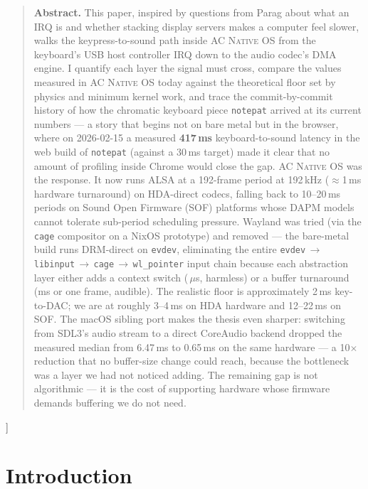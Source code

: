 \documentclass[10pt,letterpaper,twocolumn]{article}
\newcommand{\acos}{\textsc{AC Native OS}}
\begin{document}
{\begin{quote}
\small\noindent\textbf{Abstract.}
This paper, inspired by questions from Parag about what an IRQ is and whether stacking display servers makes a computer feel slower, walks the keypress-to-sound path inside \acos{} from the keyboard's USB host controller IRQ down to the audio codec's DMA engine. I quantify each layer the signal must cross, compare the values measured in \acos{} today against the theoretical floor set by physics and minimum kernel work, and trace the commit-by-commit history of how the chromatic keyboard piece \texttt{notepat} arrived at its current numbers --- a story that begins not on bare metal but in the browser, where on 2026-02-15 a measured \textbf{417\,ms} keyboard-to-sound latency in the web build of \texttt{notepat} (against a 30\,ms target) made it clear that no amount of profiling inside Chrome would close the gap. \acos{} was the response. It now runs ALSA at a 192-frame period at 192\,kHz ($\approx$1\,ms hardware turnaround) on HDA-direct codecs, falling back to 10--20\,ms periods on Sound Open Firmware (SOF) platforms whose DAPM models cannot tolerate sub-period scheduling pressure. Wayland was tried (via the \texttt{cage} compositor on a NixOS prototype) and removed --- the bare-metal build runs DRM-direct on \texttt{evdev}, eliminating the entire \texttt{evdev}\,$\rightarrow$\,\texttt{libinput}\,$\rightarrow$\,\texttt{cage}\,$\rightarrow$\,\texttt{wl\_pointer} input chain because each abstraction layer either adds a context switch (\,$\mu$s, harmless) or a buffer turnaround (ms or one frame, audible). The realistic floor is approximately 2\,ms key-to-DAC; we are at roughly 3--4\,ms on HDA hardware and 12--22\,ms on SOF. The macOS sibling port makes the thesis even sharper: switching from SDL3's audio stream to a direct CoreAudio backend dropped the measured median from 6.47\,ms to 0.65\,ms on the same hardware --- a 10$\times$ reduction that no buffer-size change could reach, because the bottleneck was a layer we had not noticed adding. The remaining gap is not algorithmic --- it is the cost of supporting hardware whose firmware demands buffering we do not need.
\end{quote}
\vspace{0.5em}
}]


\section{Introduction}
\end{document}
